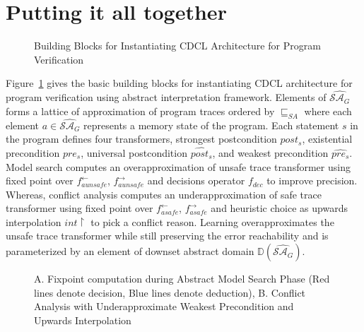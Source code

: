 {{\section{Putting it all together}
%
\begin{figure}[htbp]
\centering
\vspace*{-0.2cm}
\caption{Building Blocks for Instantiating CDCL Architecture for Program Verification \label{schema}}
\end{figure}
%
Figure~\ref{schema} gives the basic building blocks for instantiating CDCL 
architecture for program verification using abstract interpretation framework.  
Elements of $\widehat{\mathcal{SA}_{G}}$ forms a lattice of approximation of program traces
ordered by $\sqsubseteq_{SA}$ where each element $a \in \widehat{\mathcal{SA}_{G}}$ 
represents a memory state of the program.  Each statement $s$ in the program
defines four transformers, strongest postcondition $post_s$, existential precondition 
$pre_s$, universal postcondition $\widehat{post_s}$, and weakest precondition 
$\widehat{pre_s}$.  Model search computes an overapproximation of unsafe trace 
transformer using fixed point over $f_{aunsafe}^{\leftarrow}$, $f_{aunsafe}^{\rightarrow}$ 
and decisions operator $f_{dec}$ to improve precision.  
Whereas, conflict analysis computes an underapproximation of safe trace transformer 
using fixed point over $f_{asafe}^{\leftarrow}$, $f_{asafe}^{\rightarrow}$ and
heuristic choice as upwards interpolation $int\upharpoonright$ to pick a conflict reason.
Learning overapproximates the unsafe trace transformer while still preserving the error reachability 
and is parameterized by an element of downset abstract domain $\mathbb{D}(\widehat{\mathcal{SA}_{G}})$.
%
\begin{figure}[t]
\begin{minipage}{4cm}
\centering
{}
  \label{model-fixpoint}
\end{minipage}%
\hspace{10em}%
\begin{minipage}{4.0cm}
\centering
{}
\label{conflict-fixpoint}
\end{minipage}
  \caption {
  A. Fixpoint computation during Abstract Model Search Phase (Red lines denote
  decision, Blue lines denote deduction), B. Conflict Analysis with 
  Underapproximate Weakest Precondition and Upwards Interpolation
  \label{fixpoint}}
\end{figure}
%

}}
